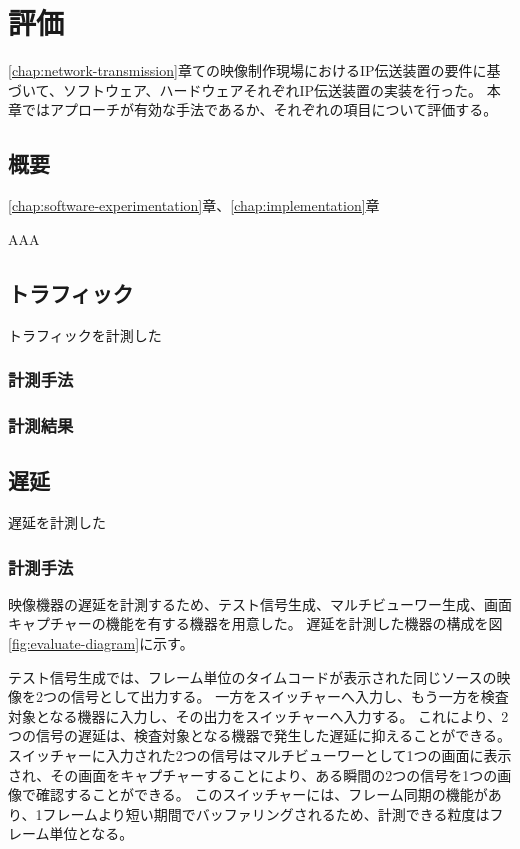 \chapter{評価}
\label{chap:evaluation}

\ref{chap:network-transmission}章ての映像制作現場におけるIP伝送装置の要件に基づいて、ソフトウェア、ハードウェアそれぞれIP伝送装置の実装を行った。
本章ではアプローチが有効な手法であるか、それぞれの項目について評価する。

\section{概要}

\ref{chap:software-experimentation}章、\ref{chap:implementation}章

AAA

\section{トラフィック}

トラフィックを計測した

\subsection{計測手法}

\subsection{計測結果}



\section{遅延}

遅延を計測した

\subsection{計測手法}

映像機器の遅延を計測するため、テスト信号生成、マルチビューワー生成、画面キャプチャーの機能を有する機器を用意した。
遅延を計測した機器の構成を図\ref{fig:evaluate-diagram}に示す。

テスト信号生成では、フレーム単位のタイムコードが表示された同じソースの映像を2つの信号として出力する。
一方をスイッチャーへ入力し、もう一方を検査対象となる機器に入力し、その出力をスイッチャーへ入力する。
これにより、2つの信号の遅延は、検査対象となる機器で発生した遅延に抑えることができる。
スイッチャーに入力された2つの信号はマルチビューワーとして1つの画面に表示され、その画面をキャプチャーすることにより、ある瞬間の2つの信号を1つの画像で確認することができる。
このスイッチャーには、フレーム同期の機能があり、1フレームより短い期間でバッファリングされるため、計測できる粒度はフレーム単位となる。

